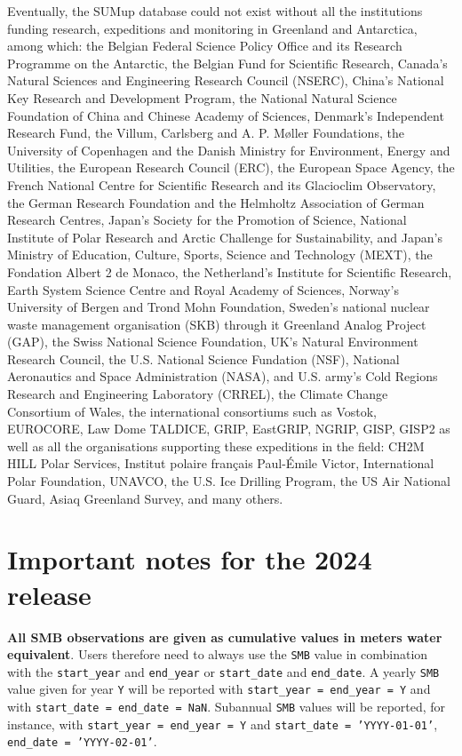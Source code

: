 \documentclass[journal abbreviation, manuscript]{copernicus}
\begin{document}
Eventually, the SUMup database could not exist without all the institutions funding research, expeditions and monitoring in Greenland and Antarctica, among which: the Belgian Federal Science Policy Office and its Research Programme on the Antarctic, the Belgian Fund for Scientific Research, Canada's Natural Sciences and Engineering Research Council (NSERC), China's National Key Research and Development Program, the National Natural Science Foundation of China and Chinese Academy of Sciences, Denmark's Independent Research Fund, the Villum, Carlsberg and A. P. Møller Foundations, the University of Copenhagen and the Danish Ministry for Environment, Energy and Utilities, the European Research Council (ERC), the European Space Agency, the French National Centre for Scientific Research and its Glacioclim Observatory, the German Research Foundation and the Helmholtz Association of German Research Centres, Japan's Society for the Promotion of Science, National Institute of Polar Research and Arctic Challenge for Sustainability, and Japan's Ministry of Education, Culture, Sports, Science and Technology (MEXT), the Fondation Albert 2 de Monaco, the Netherland's Institute for Scientific Research, Earth System Science Centre and Royal Academy of Sciences, Norway's University of Bergen and Trond Mohn Foundation, Sweden's national nuclear waste management organisation (SKB) through it Greenland Analog Project (GAP), the Swiss National Science Foundation, UK's Natural Environment Research Council, the U.S. National Science Fundation (NSF), National Aeronautics and Space Administration (NASA), and U.S. army's Cold Regions Research and Engineering Laboratory (CRREL), the Climate Change Consortium of Wales, the international consortiums such as Vostok, EUROCORE, Law Dome TALDICE, GRIP, EastGRIP, NGRIP, GISP, GISP2 as well as all the organisations supporting these expeditions in the field: CH2M HILL Polar Services, Institut polaire français Paul-Émile Victor, International Polar Foundation, UNAVCO, the U.S. Ice Drilling Program, the US Air National Guard, Asiaq Greenland Survey, and many others.


\section{Important notes for the 2024 release}

\textbf{All SMB observations are given as cumulative values in meters water equivalent}. Users therefore need to always use the \texttt{SMB} value in combination with the \texttt{start\_year} and \texttt{end\_year} or \texttt{start\_date} and \texttt{end\_date}. A yearly \texttt{SMB} value given for year \texttt{Y} will be reported with \texttt{start\_year = end\_year = Y} and with \texttt{start\_date = end\_date = NaN}. Subannual \texttt{SMB} values will be reported, for instance, with \texttt{start\_year = end\_year = Y} and \texttt{start\_date = 'YYYY-01-01'}, \texttt{end\_date = 'YYYY-02-01'}.
\end{document}
